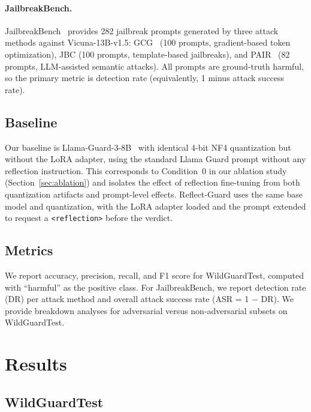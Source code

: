 \documentclass[11pt]{article}
\begin{document}
\paragraph{JailbreakBench.} JailbreakBench~\citep{chao2024jailbreakbench} provides 282 jailbreak prompts generated by three attack methods against Vicuna-13B-v1.5: GCG~\citep{zou2023universal} (100 prompts, gradient-based token optimization), JBC (100 prompts, template-based jailbreaks), and PAIR~\citep{chao2023jailbreaking} (82 prompts, LLM-assisted semantic attacks). All prompts are ground-truth harmful, so the primary metric is detection rate (equivalently, 1 minus attack success rate).

\subsection{Baseline}

Our baseline is Llama-Guard-3-8B~\citep{metallamaguard3} with identical 4-bit NF4 quantization but without the LoRA adapter, using the standard Llama Guard prompt without any reflection instruction. This corresponds to Condition~0 in our ablation study (Section~\ref{sec:ablation}) and isolates the effect of reflection fine-tuning from both quantization artifacts and prompt-level effects. Reflect-Guard uses the same base model and quantization, with the LoRA adapter loaded and the prompt extended to request a \texttt{<reflection>} before the verdict.

\subsection{Metrics}

We report accuracy, precision, recall, and F1 score for WildGuardTest, computed with ``harmful'' as the positive class. For JailbreakBench, we report detection rate (DR) per attack method and overall attack success rate (ASR = 1 $-$ DR). We provide breakdown analyses for adversarial versus non-adversarial subsets on WildGuardTest.

\section{Results}

\subsection{WildGuardTest}
\end{document}

